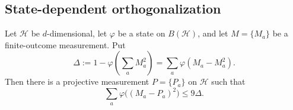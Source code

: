 \documentclass[11pt]{article}
\theoremstyle{definition}
\newcommand{\calH}{\mathcal{H}}
\begin{document}
\subsection{State-dependent orthogonalization}\label{sec:orthogonalization}

\begin{lemma}
\label{lem:state-dependent-orthogonalization}
Let $\calH$ be $d$-dimensional, let $\varphi$ be a state on
$B(\calH)$, and let $M=\{M_a\}$ be a finite-outcome measurement.  Put
\begin{equation}\label{eq:orthogonalization-defect}
 \Delta
 :=1-\varphi\left(\sum_aM_a^2\right)
 =\sum_a\varphi(M_a-M_a^2).
\end{equation}
Then there is a projective measurement $P=\{P_a\}$ on $\calH$ such that
\begin{equation}\label{eq:linear-orthogonalization}
 \sum_a\varphi\bigl((M_a-P_a)^2\bigr)\leq9\Delta.
\end{equation}
\end{lemma}
\end{document}
